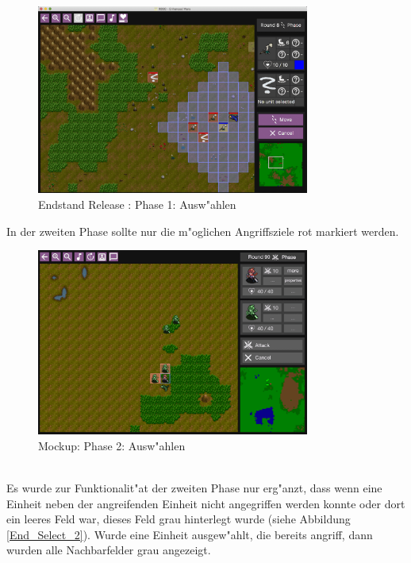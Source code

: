 \documentclass[12pt, titlepage]{scrartcl}
\newcommand{\RN}[1]{%
	\textup{\uppercase\expandafter{\romannumeral#1}}%
}
\newcounter{subsubsubsection}[subsubsection]
\begin{document}
					\begin{figure}[H] 
						\centering
						\includegraphics[width=0.8\textwidth]{images/endOfRelease/Select.png}
						\caption{Endstand Release \RN{3}: Phase 1: Ausw"ahlen}
						\label{End_Select_1}
					\end{figure}
					In der zweiten Phase sollte nur die m"oglichen Angriffsziele rot markiert werden.
					\begin{figure}[H] 
						\centering
						\includegraphics[width=0.8\textwidth]{images/mockups/Select3.png}
						\caption{Mockup: Phase 2: Ausw"ahlen}
						\label{Select_2_2}
					\end{figure}
					\ \\ Es wurde zur Funktionalit"at der zweiten Phase nur erg"anzt, dass wenn eine Einheit neben der angreifenden Einheit nicht angegriffen werden konnte oder dort ein leeres Feld war, dieses Feld grau hinterlegt wurde (siehe Abbildung \ref{End_Select_2}). Wurde eine Einheit ausgew"ahlt, die bereits angriff, dann wurden alle Nachbarfelder grau angezeigt.
\end{document}
